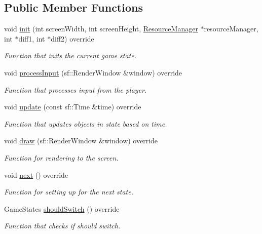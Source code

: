 \subsection*{Public Member Functions}
\begin{DoxyCompactItemize}
\item 
void \hyperlink{classDifficulty__Singleplayer__State_a9295de99494fb61a1aa852fca197ef7a}{init} (int screen\+Width, int screen\+Height, \hyperlink{classResourceManager}{Resource\+Manager} $\ast$resource\+Manager, int $\ast$diff1, int $\ast$diff2) override
\begin{DoxyCompactList}\small\item\em Function that inits the current game state. \end{DoxyCompactList}\item 
void \hyperlink{classDifficulty__Singleplayer__State_a112a98dfcd0faf74f66d5faaf0487219}{process\+Input} (sf\+::\+Render\+Window \&window) override
\begin{DoxyCompactList}\small\item\em Function that processes input from the player. \end{DoxyCompactList}\item 
void \hyperlink{classDifficulty__Singleplayer__State_ada72cc17eadfba0f8cd458655858cce4}{update} (const sf\+::\+Time \&time) override
\begin{DoxyCompactList}\small\item\em Function that updates objects in state based on time. \end{DoxyCompactList}\item 
void \hyperlink{classDifficulty__Singleplayer__State_aa356f8eb87d2be9f4f4180af3abc5662}{draw} (sf\+::\+Render\+Window \&window) override
\begin{DoxyCompactList}\small\item\em Function for rendering to the screen. \end{DoxyCompactList}\item 
void \hyperlink{classDifficulty__Singleplayer__State_ac0f2b63a78063ccff252911b0aa04811}{next} () override\hypertarget{classDifficulty__Singleplayer__State_ac0f2b63a78063ccff252911b0aa04811}{}\label{classDifficulty__Singleplayer__State_ac0f2b63a78063ccff252911b0aa04811}

\begin{DoxyCompactList}\small\item\em Function for setting up for the next state. \end{DoxyCompactList}\item 
Game\+States \hyperlink{classDifficulty__Singleplayer__State_ab414111faff96268a2397c7356eeff41}{should\+Switch} () override
\begin{DoxyCompactList}\small\item\em Function that checks if should switch. \end{DoxyCompactList}\end{DoxyCompactItemize}
